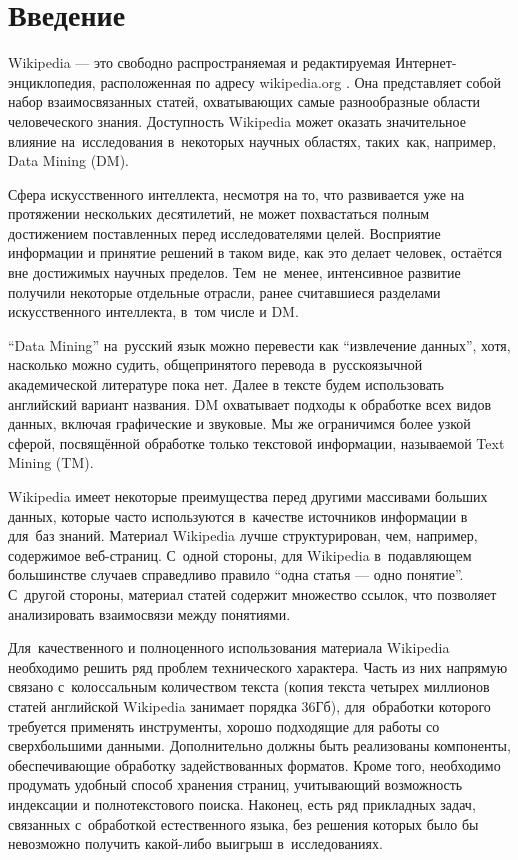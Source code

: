 \section*{Введение}

Wikipedia --- это свободно распространяемая и редактируемая 
Интернет-энциклопедия, расположенная по адресу wikipedia.org \cite{wikipedia}. 
Она представляет собой набор взаимосвязанных статей, охватывающих самые 
разнообразные области человеческого знания. 
Доступность Wikipedia может оказать значительное влияние на~исследования 
в~некоторых научных областях, таких~как, например, Data Mining (DM).

Сфера искусственного интеллекта, несмотря на то, что развивается
уже на протяжении нескольких десятилетий, не может похвастаться полным
достижением поставленных перед исследователями целей. Восприятие
информации и принятие решений в таком виде, как это делает человек,
остаётся вне достижимых научных пределов. 
Тем~не~менее, интенсивное развитие получили некоторые отдельные отрасли, ранее считавшиеся
разделами искусственного интеллекта, в~том числе и DM.

``Data Mining'' на~русский язык можно перевести как ``извлечение данных'',
хотя, насколько можно судить, общепринятого перевода в~русскоязычной
академической литературе пока нет. Далее в тексте будем использовать
английский вариант названия. 
DM охватывает подходы к обработке всех видов данных, включая графические и звуковые. 
Мы же ограничимся более узкой сферой, посвящённой
обработке только текстовой информации, называемой Text Mining (TM).

Wikipedia имеет некоторые преимущества перед другими массивами больших данных, 
которые часто используются в~качестве источников информации в для~баз знаний.
Материал Wikipedia лучше структурирован, чем, например, содержимое веб-страниц.
С~одной стороны, для Wikipedia в~подавляющем большинстве случаев справедливо
правило ``одна статья --- одно понятие''. 
С~другой стороны, материал
статей содержит множество ссылок, что позволяет анализировать
взаимосвязи между понятиями. 

Для~качественного и полноценного использования материала Wikipedia
необходимо решить ряд проблем технического характера. Часть из них
напрямую связано с~колоссальным количеством текста (копия текста четырех 
миллионов статей английской Wikipedia занимает порядка 36Гб), 
для~обработки которого требуется применять инструменты, хорошо
подходящие для работы со сверхбольшими данными. Дополнительно должны быть
реализованы компоненты, обеспечивающие обработку задействованных форматов. 
Кроме того, необходимо продумать удобный способ хранения страниц, учитывающий 
возможность индексации и полнотекстового поиска. Наконец, есть ряд 
прикладных задач, связанных с~обработкой естественного языка, без решения 
которых было бы невозможно получить какой-либо выигрыш в~исследованиях.

